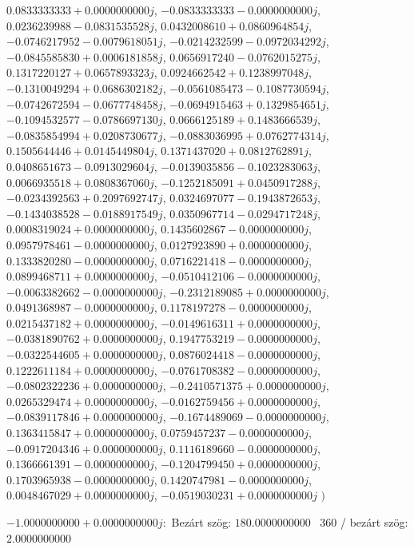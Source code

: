 \documentclass[14pt,a4paper]{article}
\begin{document}
\begin{itemize}
$0.0833333333+0.0000000000j$, $-0.0833333333-0.0000000000j$, $0.0236239988-0.0831535528j$, $0.0432008610+0.0860964854j$, $-0.0746217952-0.0079618051j$, $-0.0214232599-0.0972034292j$, $-0.0845585830+0.0006181858j$, $0.0656917240-0.0762015275j$, $0.1317220127+0.0657893323j$, $0.0924662542+0.1238997048j$, $-0.1310049294+0.0686302182j$, $-0.0561085473-0.1087730594j$, $-0.0742672594-0.0677748458j$, $-0.0694915463+0.1329854651j$, $-0.1094532577-0.0786697130j$, $0.0666125189+0.1483666539j$, $-0.0835854994+0.0208730677j$, $-0.0883036995+0.0762774314j$, $0.1505644446+0.0145449804j$, $0.1371437020+0.0812762891j$, $0.0408651673-0.0913029604j$, $-0.0139035856-0.1023283063j$, $0.0066935518+0.0808367060j$, $-0.1252185091+0.0450917288j$, $-0.0234392563+0.2097692747j$, $0.0324697077-0.1943872653j$, $-0.1434038528-0.0188917549j$, $0.0350967714-0.0294717248j$, $0.0008319024+0.0000000000j$, $0.1435602867-0.0000000000j$, $0.0957978461-0.0000000000j$, $0.0127923890+0.0000000000j$, $0.1333820280-0.0000000000j$, $0.0716221418-0.0000000000j$, $0.0899468711+0.0000000000j$, $-0.0510412106-0.0000000000j$, $-0.0063382662-0.0000000000j$, $-0.2312189085+0.0000000000j$, $0.0491368987-0.0000000000j$, $0.1178197278-0.0000000000j$, $0.0215437182+0.0000000000j$, $-0.0149616311+0.0000000000j$, $-0.0381890762+0.0000000000j$, $0.1947753219-0.0000000000j$, $-0.0322544605+0.0000000000j$, $0.0876024418-0.0000000000j$, $0.1222611184+0.0000000000j$, $-0.0761708382-0.0000000000j$, $-0.0802322236+0.0000000000j$, $-0.2410571375+0.0000000000j$, $0.0265329474+0.0000000000j$, $-0.0162759456+0.0000000000j$, $-0.0839117846+0.0000000000j$, $-0.1674489069-0.0000000000j$, $0.1363415847+0.0000000000j$, $0.0759457237-0.0000000000j$, $-0.0917204346+0.0000000000j$, $0.1116189660-0.0000000000j$, $0.1366661391-0.0000000000j$, $-0.1204799450+0.0000000000j$, $0.1703965938-0.0000000000j$, $0.1420747981-0.0000000000j$, $0.0048467029+0.0000000000j$, $-0.0519030231+0.0000000000j$
$\big)$
\end{itemize}
$-1.0000000000+0.0000000000j$:\
Bezárt szög: $180.0000000000$ \
360 / bezárt szög: $2.0000000000$\
\end{document}

